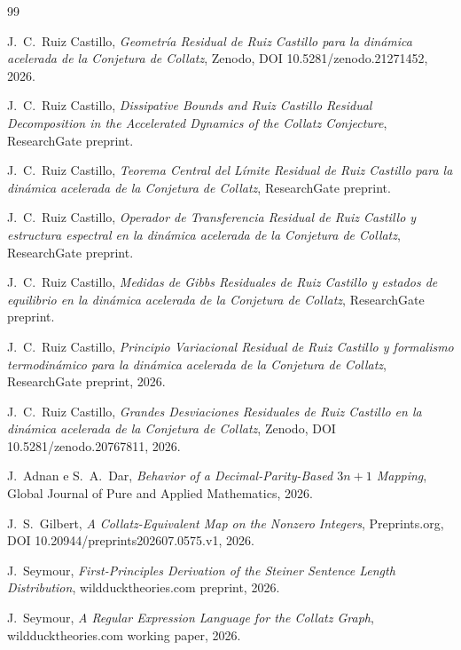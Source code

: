 \documentclass[11pt]{article}
\begin{document}
\begin{thebibliography}{99}

 J.\ C.\ Ruiz Castillo, \emph{Geometría
  Residual de Ruiz Castillo para la dinámica acelerada de la Conjetura
  de Collatz}, Zenodo, DOI 10.5281/zenodo.21271452, 2026.

 J.\ C.\ Ruiz Castillo, \emph{Dissipative
  Bounds and Ruiz Castillo Residual Decomposition in the Accelerated
  Dynamics of the Collatz Conjecture}, ResearchGate preprint.

 J.\ C.\ Ruiz Castillo, \emph{Teorema Central
  del Límite Residual de Ruiz Castillo para la dinámica acelerada de la
  Conjetura de Collatz}, ResearchGate preprint.

 J.\ C.\ Ruiz Castillo, \emph{Operador de
  Transferencia Residual de Ruiz Castillo y estructura espectral en la
  dinámica acelerada de la Conjetura de Collatz}, ResearchGate preprint.

 J.\ C.\ Ruiz Castillo, \emph{Medidas de
  Gibbs Residuales de Ruiz Castillo y estados de equilibrio en la
  dinámica acelerada de la Conjetura de Collatz}, ResearchGate preprint.

 J.\ C.\ Ruiz Castillo, \emph{Principio
  Variacional Residual de Ruiz Castillo y formalismo termodinámico para
  la dinámica acelerada de la Conjetura de Collatz}, ResearchGate
  preprint, 2026.

 J.\ C.\ Ruiz Castillo, \emph{Grandes
  Desviaciones Residuales de Ruiz Castillo en la dinámica acelerada de
  la Conjetura de Collatz}, Zenodo, DOI 10.5281/zenodo.20767811, 2026.

 J.\ Adnan e S.\ A.\ Dar, \emph{Behavior of a
  Decimal-Parity-Based $3n+1$ Mapping}, Global Journal of Pure and
  Applied Mathematics, 2026.

 J.\ S.\ Gilbert, \emph{A Collatz-Equivalent Map on
  the Nonzero Integers}, Preprints.org, DOI
  10.20944/preprints202607.0575.v1, 2026.

 J.\ Seymour, \emph{First-Principles Derivation of
  the Steiner Sentence Length Distribution}, wildducktheories.com
  preprint, 2026.

 J.\ Seymour, \emph{A Regular Expression Language
  for the Collatz Graph}, wildducktheories.com working paper, 2026.


\end{thebibliography}
\end{document}
